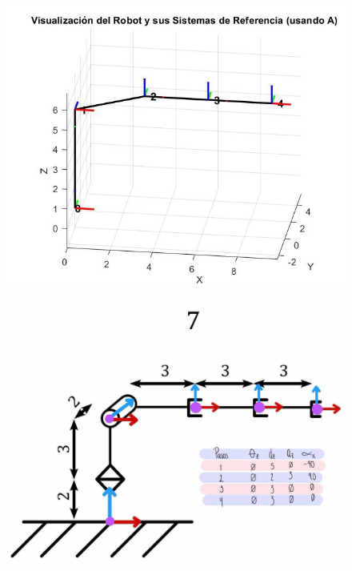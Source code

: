 \begin{figure}
	\centering
	\includegraphics[width=0.7\linewidth]{../../img/ejercicio_7-matlab}
	\caption{}
	\label{fig:ejercicio7-matlab}
\end{figure}
\begin{figure}
	\centering
	\includegraphics[width=0.7\linewidth]{../../img/ejercicio_7-dibujo}
	\caption{}
	\label{fig:ejercicio7-dibujo}
\end{figure}
